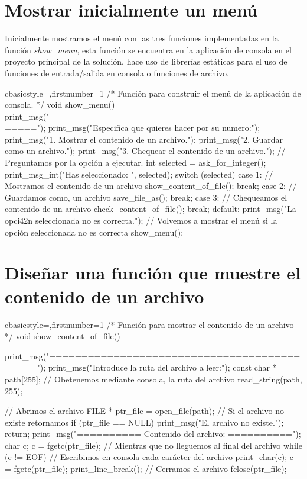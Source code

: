 \section{Mostrar inicialmente un menú}
	Inicialmente mostramos el menú con las tres funciones implementadas en la función \textit{show\_menu}, esta función se encuentra en la aplicación de consola en el proyecto principal de la solución, hace uso de librerías estáticas para el uso de funciones de entrada/salida en consola o funciones de archivo.
	\begin{sourcecodep}[]{c}{basicstyle={\fontsize{12}{12}\selectfont\ttfamily},firstnumber=1}{}
/*
	Función para construir el menú de la aplicación de consola.
*/
void show_menu() {
	print_msg("============================================");
	print_msg("Especifica que quieres hacer por su numero:");
	print_msg("1. Mostrar el contenido de un archivo.");
	print_msg("2. Guardar como un archivo.");
	print_msg("3. Chequear el contenido de un archivo.");
	// Preguntamos por la opción a ejecutar.
	int selected = ask_for_integer();
	print_msg_int("Has seleccionado: ", selected);
	switch (selected)
	{
		case 1:
			// Mostramos el contenido de un archivo
			show_content_of_file();
			break;
		case 2:
			// Guardamos como, un archivo
			save_file_as();
			break;
		case 3:
			// Chequeamos el contenido de un archivo
			check_content_of_file();
			break;
		default:
			print_msg("La opci\242n seleccionada no es correcta.");
			// Volvemos a mostrar el menú si la opción seleccionada no es correcta
			show_menu();
	}
}\end{sourcecodep}
\newpage
\section{Diseñar una función que muestre el contenido de un archivo}
	\begin{sourcecodep}[]{c}{basicstyle={\fontsize{12}{12}\selectfont\ttfamily},firstnumber=1}{}
/*
	Función para mostrar el contenido de un archivo
*/
void show_content_of_file() {
	print_msg("============================================");
	print_msg("Introduce la ruta del archivo a leer:");
	const char * path[255];
	// Obetenemos mediante consola, la ruta del archivo
	read_string(path, 255);
	
	// Abrimos el archivo
	FILE * ptr_file = open_file(path);
	// Si el archivo no existe retornamos
	if (ptr_file == NULL)
	{
		print_msg("El archivo no existe.");
		return;
	}
	print_msg("========== Contenido del archivo: ==========");
	char c;
	c = fgetc(ptr_file);
	// Mientras que no lleguemos al final del archivo
	while (c != EOF)
	{
		// Escribimos en consola cada carácter del archivo
		print_char(c);
		c = fgetc(ptr_file);
	}
	print_line_break();
	// Cerramos el archivo
	fclose(ptr_file);
}\end{sourcecodep}
\newpage
